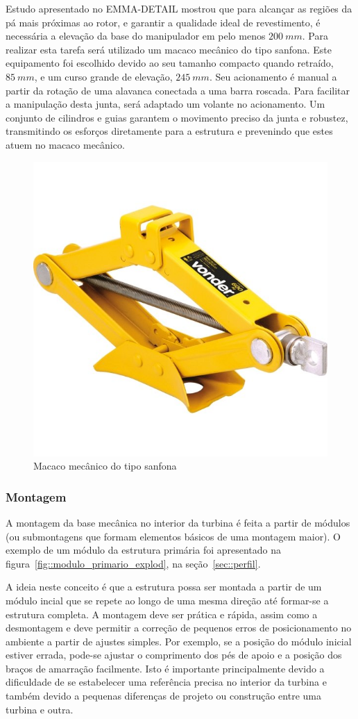 Estudo apresentado no EMMA-DETAIL mostrou que para alcançar as regiões da pá
mais próximas ao rotor, e garantir a qualidade ideal de revestimento, é
necessária a elevação da base do manipulador em pelo menos $200~mm$.
Para realizar esta tarefa será utilizado um macaco mecânico do tipo sanfona.
Este equipamento foi escolhido devido ao seu tamanho compacto quando retraído,
$85~mm$, e um curso grande de elevação, $245~mm$. Seu acionamento é manual a
partir da rotação de uma alavanca conectada a uma barra roscada.
Para facilitar a manipulação desta junta, será adaptado um volante no
acionamento.
Um conjunto de cilindros e guias garantem o movimento preciso da junta e
robustez, transmitindo os esforços diretamente para a estrutura e prevenindo que
estes atuem no macaco mecânico.

\begin{figure}[h!]
	\centering
	\includegraphics[width=0.6\columnwidth]{method/figs/construcao/macaco_sanfona}
	\caption{Macaco mecânico do tipo sanfona}
    \label{fig::macaco_sanfona}
\end{figure}

\subsubsection{Montagem}

A montagem da base mecânica no interior da turbina é feita a partir de módulos
(ou submontagens que formam elementos básicos de uma montagem maior). O exemplo
de um módulo da estrutura primária foi apresentado na
figura~\ref{fig::modulo_primario_explod}, na seção~\ref{sec::perfil}. 

A ideia neste conceito é que a estrutura possa ser montada a partir de um módulo
incial que se repete ao longo de uma mesma direção até formar-se a estrutura
completa. A montagem deve ser prática e rápida, assim como a desmontagem e
deve permitir a correção de pequenos erros de posicionamento no
ambiente a partir de ajustes simples. Por exemplo, se a posição do módulo
inicial estiver errada, pode-se ajustar o comprimento dos pés de apoio e a
posição dos braços de amarração facilmente. Isto é importante principalmente
devido a dificuldade de se estabelecer uma referência precisa no interior da
turbina e também devido a pequenas diferenças de projeto ou construção entre uma
turbina e outra.



